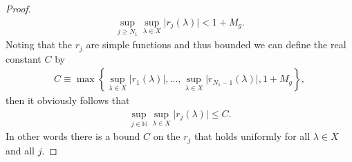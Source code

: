 \begin{proof}
\begin{align}
    \sup\limits_{j \ge N_1} \sup\limits_{\lambda \in X} \lvert r_j(\lambda) \rvert < 1 + M_g.
\end{align}
Noting that the $r_j$ are simple functions and thus bounded we can define the real constant $C$ by
\begin{align}
    C \equiv \max \left\{ \sup\limits_{\lambda \in X} \lvert r_1(\lambda) \rvert, \ldots, \sup\limits_{\lambda \in X} \lvert r_{N_1 - 1} (\lambda) \rvert, 1 + M_g \right\},
\end{align}
then it obviously follows that
\begin{align}
    \sup\limits_{j \in \mathbb{N}} \sup\limits_{\lambda \in X} \lvert r_j(\lambda) \rvert \le C.
\end{align}
In other words there is a bound $C$ on the $r_j$ that holds uniformly for all $\lambda \in X$ and all $j$.


\end{proof}
